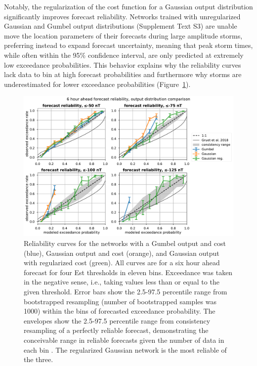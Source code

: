 Notably, the regularization of the cost function for a Gaussian output distribution significantly improves forecast reliability. Networks trained with unregularized Gaussian and Gumbel output distributions (Supplement Text S3) are unable move the location parameters of their forecasts during large amplitude storms, preferring instead to expand forecast uncertainty, meaning that peak storm times, while often within the 95\% confidence interval, are only predicted at extremely low exceedance probabilities. This behavior explains why the reliability curves lack data to bin at high forecast probabilities and furthermore why storms are underestimated for lower exceedance probabilities (Figure~\ref{fig:reliability}).

\begin{figure}[htbp]
  \centering
  \includegraphics[width=1.0\textwidth]{figures/est_forecast_reliability_distcompare_t+6.pdf} 
  \caption{Reliability curves for the networks with a Gumbel output and cost (blue), Gaussian output and cost (orange), and Gaussian output with regularized cost (green). All curves are for a six hour ahead forecast for four Est thresholds in eleven bins. Exceedance was taken in the negative sense, i.e., taking values less than or equal to the given threshold. Error bars show the 2.5-97.5 percentile range from bootstrapped resampling (number of bootstrapped samples was 1000) within the bins of forecasted exceedance probability. The envelopes show the 2.5-97.5 percentile range from consistency resampling of a perfectly reliable forecast, demonstrating the conceivable range in reliable forecasts given the number of data in each bin \citep{Brocker2007}. The regularized Gaussian network is the most reliable of the three. }
  \label{fig:reliability}
\end{figure}

